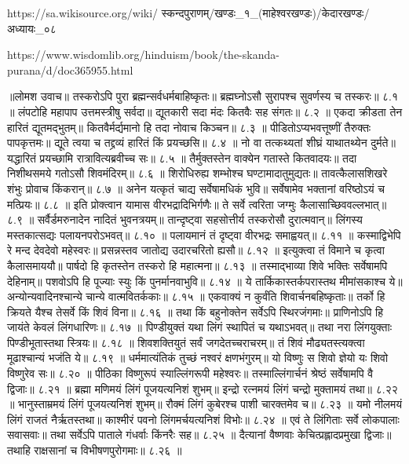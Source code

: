https://sa.wikisource.org/wiki/
स्कन्दपुराणम्/खण्डः_१_(माहेश्वरखण्डः)/केदारखण्डः/अध्यायः_०८

https://www.wisdomlib.org/hinduism/book/the-skanda-purana/d/doc365955.html


॥लोमश उवाच॥
तस्करोऽपि पुरा ब्रह्मन्सर्वधर्मबाहिष्कृतः॥
ब्रह्मघ्नोऽसौ सुरापश्च सुवर्णस्य च तस्करः॥ ८.१ ॥
लंपटोहि महापाप उत्तमस्त्रीषु सर्वदा॥
द्यूतकारी सदा मंदः कितवैः सह संगतः॥ ८.२ ॥
एकदा क्रीडता तेन हारितं द्यूतमद्भुतम्॥
कितवैर्मर्द्यमानो हि तदा नोवाच किञ्चन॥ ८.३ ॥
पीडितोऽप्यभवत्तूष्णीं तैरुक्तः पापकृत्तमः॥
द्यूते त्वया च तद्द्रव्यं हारितं किं प्रयच्छसि॥ ८.४ ॥
नो वा तत्कथ्यतां शीघ्रं याथातथ्येन दुर्मते॥
यद्धारितं प्रयच्छामि रात्रावित्यब्रवीच्च सः॥ ८.५ ॥
तैर्मुक्तस्तेन वाक्येन गतास्ते कितवादयः॥
तदा निशीथसमये गतोऽसौ शिवमंदिरम्॥ ८.६ ॥
शिरोधिरुह्य शम्भोश्च घण्टामादातुमुद्यतः॥
तावत्कैलासशिखरे शंभुः प्रोवाच किंकरान्॥ ८.७ ॥
अनेन यत्कृतं चाद्य सर्वेषामधिकं भुवि॥
सर्वेषामेव भक्तानां वरिष्ठोऽयं च मत्प्रियः॥ ८.८ ॥
इति प्रोक्त्वान यामास वीरभद्रादिभिर्गणैः॥
ते सर्वे त्वरिता जग्मुः कैलासाच्छिववल्लभात्॥ ८.९ ॥
सर्वैर्डमरुनादेन नादितं भुवनत्रयम्॥
तान्दृष्ट्वा सहसोत्तीर्य तस्करोसौ दुरात्मवान्॥
लिंगस्य मस्तकात्सद्यः पलायनपरोऽभवत्॥ ८.१० ॥
पलायमानं तं दृष्ट्वा वीरभद्रः समाह्वयत्॥ ८.११ ॥
कस्माद्विभेपि रे मन्द देवदेवो महेस्वरः॥
प्रसन्नस्तव जातोद्य उदारचरितो ह्यसौ॥ ८.१२ ॥
इत्युक्त्वा तं विमाने च कृत्वा कैलासमाययौ॥
पार्षदो हि कृतस्तेन तस्करो हि महात्मना॥ ८.१३ ॥
तस्माद्भाव्या शिवे भक्तिः सर्वेषामपि देहिनाम्॥
पशवोऽपि हि पूज्याः स्युः किं पुनर्मानवाभुवि॥ ८.१४ ॥
ये तार्किकास्तर्कपरास्तथ मीमांसकाश्च ये॥
अन्योन्यवादिनश्चान्ये चान्ये वात्मवितर्ककाः॥ ८.१५ ॥
एकवाक्यं न कुर्वंति शिवार्चनबहिष्कृताः॥
तर्को हि क्रियते यैश्च तेसर्वे किं शिवं विना॥ ८.१६ ॥
तथा किं बहुनोक्तेन सर्वेऽपि स्थिरजंगमाः॥
प्राणिनोऽपि हि जायंते केवलं लिंगधारिणः॥ ८.१७ ॥
पिण्डीयुक्तं यथा लिंगं स्थापितं च यथाऽभवत्॥
तथा नरा लिंगयुक्ताः पिण्डीभूतास्तथा स्त्रियः॥ ८.१८ ॥
शिवशक्तियुतं सर्वं जगदेतच्चराचरम्॥
तं शिवं मौढ्यतस्त्यक्त्वा मूढाश्चान्यं भजंति ये॥ ८.१९ ॥
धर्ममात्यंतिकं तुच्छं नश्वरं क्षणभंगुरम्॥
यो विष्णुः स शिवो ज्ञेयो यः शिवो विष्णुरेव सः॥ ८.२० ॥
पीठिका विष्णुरूपं स्याल्लिंगरूपी महेश्वरः॥
तस्माल्लिंगार्चनं श्रेष्ठं सर्वेषामपि वै द्विजाः॥ ८.२१ ॥
ब्रह्मा मणिमयं लिंगं पूजयत्यनिशं शुभम्॥
इन्द्रो रत्नमयं लिंगं चन्द्रो मुक्तामयं तथा॥ ८.२२ ॥
भानुस्ताम्रमयं लिंगं पूजयत्यनिशं शुभम्॥
रौक्मं लिंगं कुबेरश्च पाशी चारक्तमेव च॥ ८.२३ ॥
यमो नीलमयं लिंगं राजतं नैर्ऋतस्तथा॥
काश्मीरं पवनो लिंगमर्चयत्यनिशं विभोः॥ ८.२४ ॥
एवं ते लिंगिताः सर्वे लोकपालाः सवासवाः॥
तथा सर्वेऽपि पाताले गंधर्वाः किंनरैः सह॥ ८.२५ ॥
दैत्यानां वैष्णवाः केचित्प्रह्लादप्रमुखा द्विजाः॥
तथाहि राक्षसानां च विभीषणपुरोगमाः॥ ८.२६ ॥
